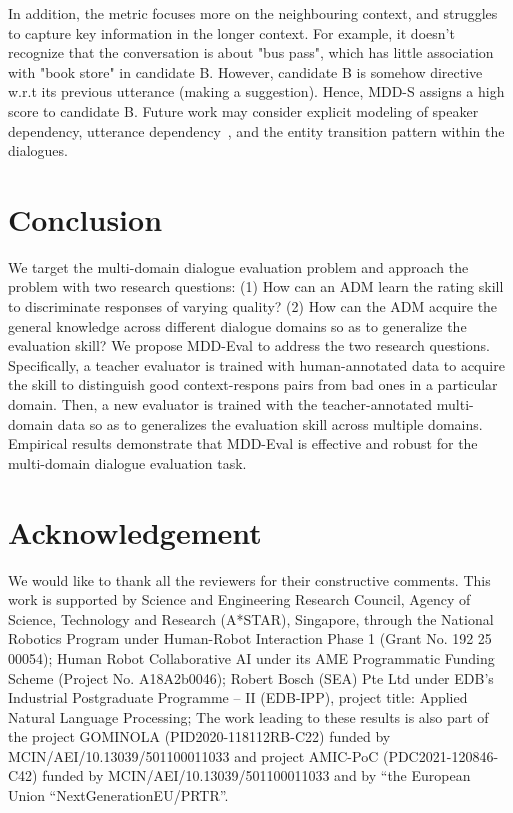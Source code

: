 \documentclass[letterpaper]{article} \usepackage{aaai22}  \usepackage{times}  \usepackage{helvet}  \usepackage{courier}  \usepackage[hyphens]{url}  \usepackage{graphicx} \urlstyle{rm} \def\UrlFont{\rm}  \usepackage{natbib}  \usepackage{caption} \DeclareCaptionStyle{ruled}{labelfont=normalfont,labelsep=colon,strut=off} \frenchspacing  \setlength{\pdfpagewidth}{8.5in}  \setlength{\pdfpageheight}{11in}  \usepackage{algorithm}
\begin{document}
In addition, the metric focuses more on the neighbouring context, and struggles to capture key information in the longer context. For example, it doesn't recognize that the conversation is about "bus pass", which has little association with "book store" in candidate B. However, candidate B is somehow directive w.r.t its previous utterance (making a suggestion). Hence, MDD-S assigns a high score to candidate B. Future work may consider explicit modeling of speaker dependency, utterance dependency~\citep{zhang-etal-2021-dynaeval}, and the entity transition pattern within the dialogues.












\section{Conclusion}
\label{sec:conclusion}

We target the multi-domain dialogue evaluation problem and approach the problem with two research questions: (1) How can an ADM learn the rating skill to discriminate responses of varying quality? (2) How can the ADM acquire the general knowledge across different dialogue domains so as to generalize the evaluation skill? We propose MDD-Eval to address the two research questions. Specifically, a teacher evaluator is trained with human-annotated data to acquire the skill to distinguish good context-respons pairs from bad ones in a particular domain. Then, a new evaluator is trained with the teacher-annotated multi-domain data so as to generalizes the evaluation skill across multiple domains. Empirical results demonstrate that MDD-Eval is effective and robust for the multi-domain dialogue evaluation task.

\newpage
\section*{Acknowledgement}
We would like to thank all the reviewers for their constructive comments. This work is supported by Science and Engineering Research Council, Agency of Science, Technology and Research (A*STAR), Singapore, through the National Robotics Program under Human-Robot Interaction Phase 1 (Grant No. 192 25 00054);  Human Robot Collaborative AI under its AME Programmatic Funding Scheme (Project No. A18A2b0046); Robert Bosch (SEA) Pte Ltd under EDB’s Industrial Postgraduate Programme – II (EDB-IPP), project title: Applied Natural Language Processing; The work leading to these results is also part of the project GOMINOLA (PID2020-118112RB-C22) funded by MCIN/AEI/10.13039/501100011033 and project AMIC-PoC (PDC2021-120846-C42) funded by MCIN/AEI/10.13039/501100011033 and by “the European Union “NextGenerationEU/PRTR”.



\newpage
\end{document}
